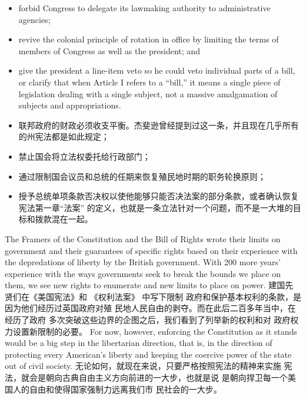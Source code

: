 \begin{paracol}{2}
\begin{itemize}
	\item forbid Congress to delegate its lawmaking authority to administrative agencies;
	\item revive the colonial principle of rotation in office by limiting the terms of members of Congress as well as the president;
	and
	\item give the president a line-item veto so he could veto individual parts of a bill, or clarify that when Article I refers to a ``bill,'' it means a single piece of legislation dealing with a single subject, not a massive amalgamation of subjects and appropriations.
\end{itemize}
\switchcolumn
\begin{itemize}
	\item 联邦政府的财政必须收支平衡。杰斐逊曾经提到过这一条，并且现在几乎所有的州宪法都是如此规定；
	\item 禁止国会将立法权委托给行政部门；
	\item 通过限制国会议员和总统的任期来恢复殖民地时期的职务轮换原则；
	\item 授予总统单项条款否决权以使他能够只能否决法案的部分条款，或者确认恢复宪法第一章“法案” 的定义，也就是一条立法针对一个问题，而不是一大堆的目标和拨款混在一起。
\end{itemize}
\switchcolumn*
The Framers of the Constitution and the Bill of Rights wrote
their limits on government and their guarantees of specific
rights based on their experience with the depredations of liberty
by the British government. With 200 more years' experience
with the ways governments seek to break the bounds we place on them, we see new rights to enumerate and new limits to
place on power.
\switchcolumn
建国先贤们在《美国宪法》和 《权利法案》 中写下限制
政府和保护基本权利的条款，是因为他们经历过英国政府对殖
民地人民自由的剥夺。而在此后二百多年当中，在经历了政府
多次突破这些边界的企图之后，我们看到了列举新的权利和对
政府权力设置新限制的必要。
\switchcolumn*
For now, however, enforcing the Constitution as it stands
would be a big step in the libertarian direction, that is, in the
direction of protecting every American's liberty and keeping
the coercive power of the state out of civil society.
\switchcolumn
无论如何，就现在来说，只要严格按照宪法的精神来实施
宪法，就会是朝向古典自由主义方向前进的一大步，也就是说
是朝向捍卫每一个美国人的自由和使得国家强制力远离我们市
民社会的一大步。

\end{paracol}

